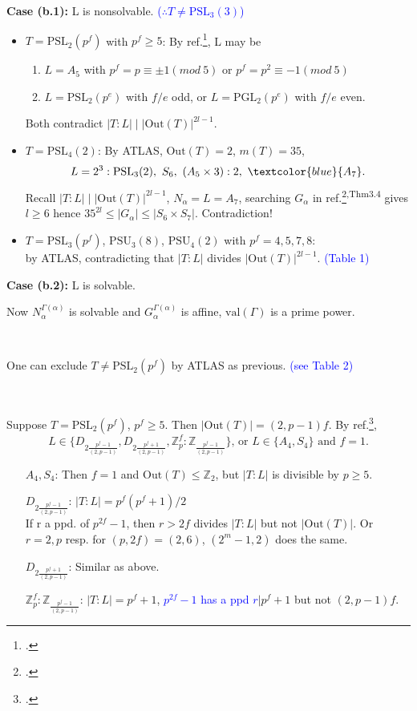 \documentclass{beamer}
\def\PSL{\mathrm{PSL}}
\def\PGL{\mathrm{PGL}}
\def\PSU{\mathrm{PSU}}
\def\Out{\mathrm{Out}}
\def\val{\mathrm{val}}
\begin{document}
\begin{frame}
\textbf{Case (b.1): } L is nonsolvable. \qquad \textcolor{blue}{($\therefore T\neq \PSL_3(3)$)}
\begin{itemize}
	\item $T=\PSL_2(p^f)$ with $p^f\geq 5$: By ref.\footcite{Dickson1958LinearGW}, L may be
		\begin{enumerate}
			\item $L=A_5$ with $p^f=p\equiv \pm 1(mod\ 5)$ or $p^f=p^2\equiv - 1(mod\ 5)$ 
			\item $L=\PSL_2(p^e)$ with $f/e$ odd, or $L=\PGL_2(p^e)$ with $f/e$ even.
		\end{enumerate} Both contradict $|T:L|\mid |\Out(T)|^{2l-1}$.
	\item $T=\PSL_4(2)$: By ATLAS, $\Out(T)=2$, $m(T)=35$, \[L=2^3:\PSL_3(2),\ S_6,\ (A_5\times 3):2,\ \textcolor{blue}{A_7}.\]Recall $|T:L|\mid |\Out(T)|^{2l-1}$, $N_\alpha=L=A_7$, searching $G_\alpha$ in ref.\footcite{LI20162907}\textsuperscript{,Thm3.4} gives $l\geq 6$ hence $35^{2l}\leq |G_\alpha|\leq |S_6\times S_7|$. Contradiction!
	\item $T=\PSL_3(p^f)$, $\PSU_3(8)$, $\PSU_4(2)$ with $p^f=4,5,7,8$:\\by ATLAS, contradicting that $|T:L|$ divides $|\Out(T)|^{2l-1}$. \textcolor{blue}{(Table 1)}
\end{itemize}
\end{frame}

\begin{frame}
\textbf{Case (b.2): } L is solvable.

Now $N_\alpha^{\Gamma(\alpha)}$ is solvable and $G_\alpha^{\Gamma(\alpha)}$ is affine, $\val(\Gamma)$ is a prime power.

\

One can exclude $T\neq \PSL_2(p^f)$ by ATLAS as previous. \textcolor{blue}{(see Table 2)}

\ 

Suppose $T=\PSL_2(p^f)$, $p^f\geq 5$. Then $|\Out(T)|=(2,p-1)f$. By ref.\footcite{Dickson1958LinearGW},\[L\in\{D_{2\frac{p^f-1}{(2,p-1)}},D_{2\frac{p^f+1}{(2,p-1)}},\mathbb{Z}_p^f:\mathbb{Z}_{\frac{p^f-1}{(2,p-1)}}\}\text{, or } L\in\{A_4,S_4\}\text{ and } f=1.\]

\begin{itemize}\setlength{\itemindent}{2.5em}
	\item[$A_4,S_4$:] Then $f=1$ and $\Out(T)\leq \mathbb{Z}_2$, but $|T:L|$ is divisible by $p\geq 5$.
	\item[$D_{2\frac{p^f-1}{(2,p-1)}}$:] $|T:L|=p^f(p^f+1)/2$ \\If r a ppd. of $p^{2f}-1$, then $r>2f$ divides $|T:L|$ but not $|\Out(T)|$. Or $r=2,p$ resp. for $(p,2f)=(2,6)$, $(2^m-1,2)$ does the same.
	\item[$D_{2\frac{p^f+1}{(2,p-1)}}$:] Similar as above.
	\item[$\mathbb{Z}_p^f:\mathbb{Z}_{\frac{p^f-1}{(2,p-1)}}$:] $|T:L|=p^f+1$, \textcolor{blue}{$p^{2f}-1$ has a ppd $r$}$|p^f+1$ but not $(2,p-1)f$.
\end{itemize}

\end{frame}
\end{document}
